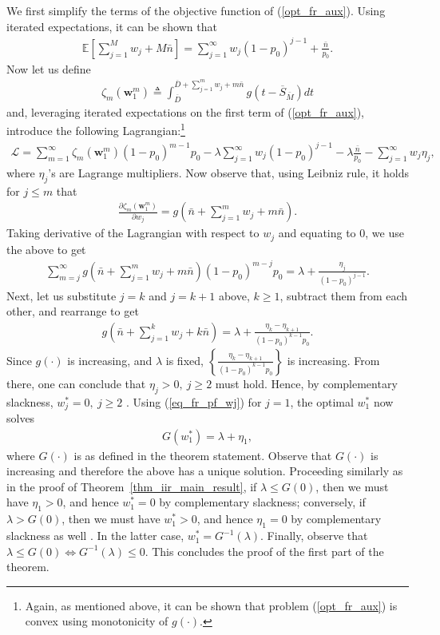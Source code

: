 \documentclass[12pt,journal,onecolumn]{IEEEtran}
\begin{document}
We first simplify the terms of the objective function of (\ref{opt_fr_aux}). Using iterated expectations, it can be shown that
\begin{align}
\mathbb{E}\left[\sum_{j=1}^Mw_j+M\bar{n}\right]=\sum_{j=1}^\infty w_j(1-p_0)^{j-1}+\frac{\bar{n}}{p_0}.
\end{align}
Now let us define
\begin{align}
\zeta_m\left({\bm w}_1^m\right)\triangleq\int_{\overline{D}}^{\overline{D}+\sum_{j=1}^mw_j+m\bar{n}}g\left(t-\overline{S}_{\bar{M}}\right)dt
\end{align}
and, leveraging iterated expectations on the first term of (\ref{opt_fr_aux}), introduce the following Lagrangian:\footnote{Again, as mentioned above, it can be shown that problem (\ref{opt_fr_aux}) is convex using monotonicity of $g(\cdot)$.}
\begin{align}
\mathcal{L}=\sum_{m=1}^\infty \zeta_m\left({\bm w}_1^m\right)(1-p_0)^{m-1}p_0-\lambda\sum_{j=1}^\infty w_j(1-p_0)^{j-1}-\lambda\frac{\bar{n}}{p_0}-\sum_{j=1}^\infty w_j\eta_j,
\end{align}
where $\eta_j$'s are Lagrange multipliers. Now observe that, using Leibniz rule, it holds for $j\leq m$ that
\begin{align}
\frac{\partial \zeta_m\left({\bm w}_1^m\right)}{\partial w_j}=g\left(\bar{n}+\sum_{j=1}^mw_j+m\bar{n}\right).
\end{align}
Taking derivative of the Lagrangian with respect to $w_j$ and equating to $0$, we use the above to get
\begin{align} \label{eq_fr_pf_wj}
\sum_{m=j}^\infty g\!\left(\!\bar{n}+\sum_{j=1}^mw_j+m\bar{n}\!\right)\!(1-p_0)^{m-j}p_0\!=\lambda\!+\!\frac{\eta_j}{(1\!-\!p_0)^{j-1}}.
\end{align}
Next, let us substitute $j=k$ and $j=k+1$ above, $k\geq1$, subtract them from each other, and rearrange to get
\begin{align}
g\left(\bar{n}+\sum_{j=1}^kw_j+k\bar{n}\right)=\lambda+\frac{\eta_k-\eta_{k+1}}{(1-p_0)^{k-1}p_0}.
\end{align}
Since $g(\cdot)$ is increasing, and $\lambda$ is fixed, $\left\{\frac{\eta_k-\eta_{k+1}}{(1-p_0)^{k-1}p_0}\right\}$ is increasing. From there, one can conclude that $\eta_j>0,~j\geq2$ must hold. Hence, by complementary slackness, $w_j^*=0,~j\geq2$ \cite{boyd}. Using (\ref{eq_fr_pf_wj}) for $j=1$, the optimal $w_1^*$ now solves
\begin{align}
G\left(w_1^*\right)=\lambda+\eta_1,
\end{align}
where $G(\cdot)$ is as defined in the theorem statement. Observe that $G(\cdot)$ is increasing and therefore the above has a unique solution. Proceeding similarly as in the proof of Theorem~\ref{thm_iir_main_result}, if $\lambda\leq G(0)$, then we must have $\eta_1>0$, and hence $w_1^*=0$ by complementary slackness; conversely, if $\lambda>G(0)$, then we must have $w_1^*>0$, and hence $\eta_1=0$ by complementary slackness as well \cite{boyd}. In the latter case, $w_1^*=G^{-1}(\lambda)$. Finally, observe that $\lambda\leq G(0)\iff G^{-1}(\lambda)\leq0$. This concludes the proof of the first part of the theorem.
\end{document}
